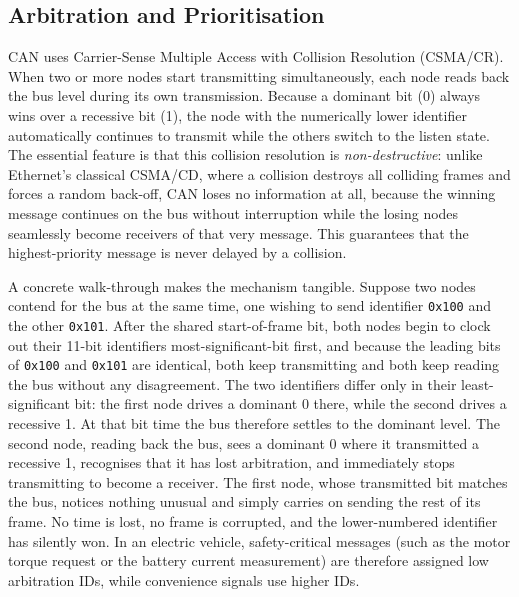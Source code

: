 \documentclass[11pt,a4paper,oneside,parskip=half]{scrreprt}
\newcommand{\canid}[1]{\texttt{0x#1}}
\providecommand{\hex}{}\renewcommand{\hex}[1]{\texttt{0x#1}}
\begin{document}
\subsection{Arbitration and Prioritisation}
CAN uses Carrier-Sense Multiple Access with Collision Resolution (CSMA/CR). When two or more nodes start transmitting simultaneously, each node reads back the bus level during its own transmission. Because a dominant bit (0) always wins over a recessive bit (1), the node with the numerically lower identifier automatically continues to transmit while the others switch to the listen state. The essential feature is that this collision resolution is \emph{non-destructive}: unlike Ethernet's classical CSMA/CD, where a collision destroys all colliding frames and forces a random back-off, CAN loses no information at all, because the winning message continues on the bus without interruption while the losing nodes seamlessly become receivers of that very message. This guarantees that the highest-priority message is never delayed by a collision.

A concrete walk-through makes the mechanism tangible. Suppose two nodes contend for the bus at the same time, one wishing to send identifier \canid{100} and the other \canid{101}. After the shared start-of-frame bit, both nodes begin to clock out their 11-bit identifiers most-significant-bit first, and because the leading bits of \hex{100} and \hex{101} are identical, both keep transmitting and both keep reading the bus without any disagreement. The two identifiers differ only in their least-significant bit: the first node drives a dominant 0 there, while the second drives a recessive 1. At that bit time the bus therefore settles to the dominant level. The second node, reading back the bus, sees a dominant 0 where it transmitted a recessive 1, recognises that it has lost arbitration, and immediately stops transmitting to become a receiver. The first node, whose transmitted bit matches the bus, notices nothing unusual and simply carries on sending the rest of its frame. No time is lost, no frame is corrupted, and the lower-numbered identifier has silently won. In an electric vehicle, safety-critical messages (such as the motor torque request or the battery current measurement) are therefore assigned low arbitration IDs, while convenience signals use higher IDs.
\end{document}
